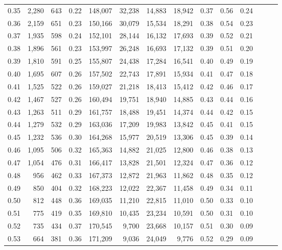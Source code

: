 \begin{tabular}{rrrrrrrrrrrrrr}
0.35 &  2,280 &  643 &  0.22 &  148,007 &   32,238 &  14,883 &  18,942 &  0.37 &  0.56 &      0.24 \\
0.36 &  2,159 &  651 &  0.23 &  150,166 &   30,079 &  15,534 &  18,291 &  0.38 &  0.54 &      0.23 \\
0.37 &  1,935 &  598 &  0.24 &  152,101 &   28,144 &  16,132 &  17,693 &  0.39 &  0.52 &      0.21 \\
0.38 &  1,896 &  561 &  0.23 &  153,997 &   26,248 &  16,693 &  17,132 &  0.39 &  0.51 &      0.20 \\
0.39 &  1,810 &  591 &  0.25 &  155,807 &   24,438 &  17,284 &  16,541 &  0.40 &  0.49 &      0.19 \\
0.40 &  1,695 &  607 &  0.26 &  157,502 &   22,743 &  17,891 &  15,934 &  0.41 &  0.47 &      0.18 \\
0.41 &  1,525 &  522 &  0.26 &  159,027 &   21,218 &  18,413 &  15,412 &  0.42 &  0.46 &      0.17 \\
0.42 &  1,467 &  527 &  0.26 &  160,494 &   19,751 &  18,940 &  14,885 &  0.43 &  0.44 &      0.16 \\
0.43 &  1,263 &  511 &  0.29 &  161,757 &   18,488 &  19,451 &  14,374 &  0.44 &  0.42 &      0.15 \\
0.44 &  1,279 &  532 &  0.29 &  163,036 &   17,209 &  19,983 &  13,842 &  0.45 &  0.41 &      0.15 \\
0.45 &  1,232 &  536 &  0.30 &  164,268 &   15,977 &  20,519 &  13,306 &  0.45 &  0.39 &      0.14 \\
0.46 &  1,095 &  506 &  0.32 &  165,363 &   14,882 &  21,025 &  12,800 &  0.46 &  0.38 &      0.13 \\
0.47 &  1,054 &  476 &  0.31 &  166,417 &   13,828 &  21,501 &  12,324 &  0.47 &  0.36 &      0.12 \\
0.48 &    956 &  462 &  0.33 &  167,373 &   12,872 &  21,963 &  11,862 &  0.48 &  0.35 &      0.12 \\
0.49 &    850 &  404 &  0.32 &  168,223 &   12,022 &  22,367 &  11,458 &  0.49 &  0.34 &      0.11 \\
0.50 &    812 &  448 &  0.36 &  169,035 &   11,210 &  22,815 &  11,010 &  0.50 &  0.33 &      0.10 \\
0.51 &    775 &  419 &  0.35 &  169,810 &   10,435 &  23,234 &  10,591 &  0.50 &  0.31 &      0.10 \\
0.52 &    735 &  434 &  0.37 &  170,545 &    9,700 &  23,668 &  10,157 &  0.51 &  0.30 &      0.09 \\
0.53 &    664 &  381 &  0.36 &  171,209 &    9,036 &  24,049 &   9,776 &  0.52 &  0.29 &      0.09 \\

\end{tabular}
